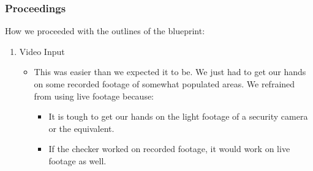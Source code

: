 \documentclass[a4paper]{article}
\begin{document}
\subsubsection{Proceedings}

How we proceeded with the outlines of the blueprint:

\begin{enumerate}
    \item Video Input
          \begin{itemize}[label={}]
              \item This was easier than we expected it to be. We just had to get our hands
                    on some recorded footage of somewhat populated areas. We refrained from using live
                    footage because:
                    \begin{itemize}
                        \item It is tough to get our hands on the light footage of a security camera or the equivalent.
                        \item If the checker worked on recorded footage, it would work on live footage as well.
                    \end{itemize}


\end{itemize}
\end{enumerate}
\end{document}
